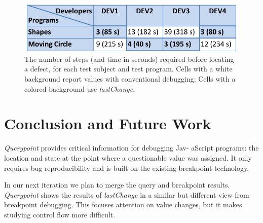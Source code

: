 \documentclass{sig-alternate}
\begin{document}
\begin{figure}[htp]
\centering 
\includegraphics[width=.48\textwidth]{10-userstudy.pdf}
\caption{The number of steps (and time in seconds) required before locating a defect, for each test subject and test program. 
Cells with a white background report values with conventional debugging; Cells with a colored background use \textit{lastChange}.}

\label{fig:userstudy}
\end{figure}


\section{Conclusion and Future Work}
\textit{Querypoint} provides critical information for debugging Jav- aScript programs: 
the location and state at the point where a questionable value was assigned. It only requires 
bug reproducibility and is built on the existing breakpoint technology.

In our next iteration we plan to merge the query and breakpoint results. \textit{Querypoint} shows the 
results of \textit{lastChange} in a similar but different view from breakpoint debugging. This focuses attention 
on value changes, but it makes studying control flow more difficult. %

\end{document}

